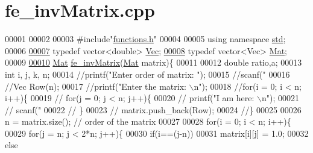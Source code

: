 \hypertarget{fe__inv_matrix_8cpp_source}{}\section{fe\+\_\+inv\+Matrix.\+cpp}
\label{fe__inv_matrix_8cpp_source}

\begin{DoxyCode}
00001 
00002 
00003 \textcolor{preprocessor}{#include"\hyperlink{functions_8h}{functions.h}"}
00004 
00005 \textcolor{keyword}{using namespace }\hyperlink{namespacestd}{std};
00006 
\hyperlink{fe__inv_matrix_8cpp_ad4d11f46a1909b55cc804ca942ce6ea4}{00007} \textcolor{keyword}{typedef} vector<double> \hyperlink{fe__inv_matrix_8cpp_ad4d11f46a1909b55cc804ca942ce6ea4}{Vec};
\hyperlink{fe__inv_matrix_8cpp_a1356201aa606214a43dbef76118a8c20}{00008} \textcolor{keyword}{typedef} vector<Vec> \hyperlink{fe__inv_matrix_8cpp_a1356201aa606214a43dbef76118a8c20}{Mat};
00009 
\hyperlink{fe__inv_matrix_8cpp_af9697f88b10fb6419ac04a523e5023ab}{00010} \hyperlink{fe__det_matrix_8cpp_a1356201aa606214a43dbef76118a8c20}{Mat} \hyperlink{fe__inv_matrix_8cpp_af9697f88b10fb6419ac04a523e5023ab}{fe\_invMatrix}(\hyperlink{fe__det_matrix_8cpp_a1356201aa606214a43dbef76118a8c20}{Mat} matrix)\{
00011 
00012     \textcolor{keywordtype}{double} ratio,a;
00013     \textcolor{keywordtype}{int} i, j, k, n;
00014     \textcolor{comment}{//printf("Enter order of matrix: ");}
00015     \textcolor{comment}{//scanf("%
00016     \textcolor{comment}{//Vec Row(n);}
00017     \textcolor{comment}{//printf("Enter the matrix: \(\backslash\)n");}
00018     \textcolor{comment}{//for(i = 0; i < n; i++)\{}
00019     \textcolor{comment}{//    for(j = 0; j < n; j++)\{}
00020     \textcolor{comment}{//      printf("I am here: \(\backslash\)n");}
00021     \textcolor{comment}{//          scanf("%
00022     \textcolor{comment}{//    \}}
00023     \textcolor{comment}{//  matrix.push\_back(Row);}
00024     \textcolor{comment}{//\}}
00025 
00026     n = matrix.size(); \textcolor{comment}{// order of the matrix}
00027 
00028     \textcolor{keywordflow}{for}(i = 0; i < n; i++)\{
00029         \textcolor{keywordflow}{for}(j = n; j < 2*n; j++)\{
00030             \textcolor{keywordflow}{if}(i==(j-n))
00031                 matrix[i][j] = 1.0;
00032             \textcolor{keywordflow}{else}
}}
\end{DoxyCode}
